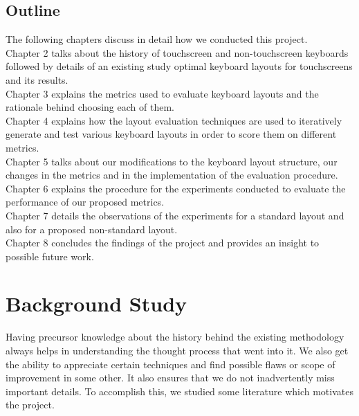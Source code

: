 \documentclass[MTech]{iitmdiss}
\begin{document}
\section{Outline}
The following chapters discuss in detail how we conducted this project.\\
Chapter 2 talks about the history of touchscreen and non-touchscreen keyboards followed by details of an existing study optimal keyboard layouts for touchscreens and its results.\\
Chapter 3 explains the metrics used to evaluate keyboard layouts and the rationale behind choosing each of them.\\
Chapter 4 explains how the layout evaluation techniques are used to iteratively generate and test various keyboard layouts in order to score them on different metrics.\\
Chapter 5 talks about our modifications to the keyboard layout structure, our changes in the metrics and in the implementation of the evaluation procedure.\\
Chapter 6 explains the procedure for the experiments conducted to evaluate the performance of our proposed metrics.\\
Chapter 7 details the observations of the experiments for a standard layout and also for a proposed non-standard layout.\\
Chapter 8 concludes the findings of the project and provides an insight to possible future work.\\

\chapter{Background Study}
Having precursor knowledge about the history behind the existing methodology always helps in understanding the thought process that went into it. We also get the ability to appreciate certain techniques and find possible flaws or scope of improvement in some other. It also ensures that we do not inadvertently miss important details. To accomplish this, we studied some literature which motivates the project.
 
\end{document}
